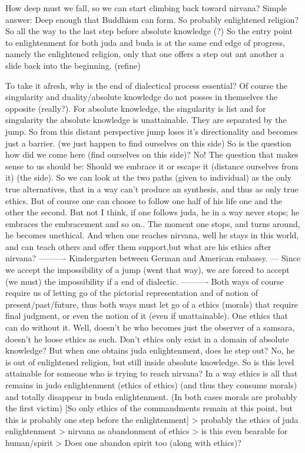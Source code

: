 \documentclass[10pt]{book}
\begin{document}
How deep must we fall, so we can start climbing back toward nirvana?
Simple answer: Deep enough that Buddhism can form. So probably enlightened religion? So all the way to the last step before absolute knowledge (?) So the entry point to enlightenment for both juda and buda is at the same end edge of progress, namely the enlightened religion, only that one offers a step out ant another a slide back into the beginning. (refine)

To take it afresh, why is the end of dialectical process essential?
Of course the singularity and duality/absolute knowledge do not posses in themselves the opposite (really?). For absolute knowledge, the singularity is list and for singularity the absolute knowledge is unattainable. They are separated by the jump. So from this distant perspective jump loses it's directionality and becomes just a barrier. (we just happen to find ourselves on this side) So is the question how did we come here (find ourselves on this side)? No! The question that makes sense to us should be: Should we embrace it or escape it (distance ourselves from it) (the side). So we can look at the two paths (given to individual) as the only true alternatives, that in a way can't produce an synthesis, and thus as only true ethics. But of course one can choose to follow one half of his life one and the other the second. But not I think, if one follows juda, he in a way never stops; he embraces the embracement and so on.. The moment one stops, and turns around, he becomes unethical.
And when one reaches nirvana, well he stays in this world, and can teach others and offer them support,but what are his ethics after nirvana?
----------
Kindergarten between German and American embassy.
---
Since we accept the impossibility of a jump (went that way), we are forced to accept (we must) the impossibility if a end of dialectic.
----------
Both ways of course require us of letting go of the pictorial representation and of notion of present/past/future, thus both ways must let go of a ethics (morals) that require final judgment, or even the notion of it (even if unattainable). One ethics that can do without it. Well, doesn't he who becomes just the observer of a samsara, doesn't he loose ethics as such. Don't ethics only exist in a domain of absolute knowledge? But when one obtains juda enlightenment, does he step out? No, he is out of enlightened religion, but still inside absolute knowledge.
So is this level attainable for someone who is trying to reach nirvana?
In a way ethics is all that remains in judo enlightenment (ethics of ethics) (and thus they consume morals) and totally disappear in buda enlightenment. (In both cases morals are probably the first victim) [So only ethics of the commandments remain at this point, but this is probably one step before the enlightenment] > probably the ethics of juda enlightenment > nirvana as abandonment of ethics > is this even bearable for human/spirit > 
Does one abandon spirit too (along with ethics)?
\end{document}
